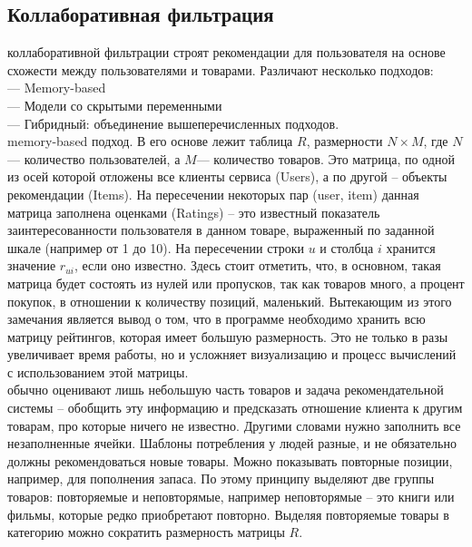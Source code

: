 \documentclass{article}
\newcommand\tab[1][1cm]{\hspace*{#1}}
\begin{document}
\subsection{Коллаборативная фильтрация}
 коллаборативной фильтрации строят рекомендации для пользователя на основе схожести между пользователями и товарами. Различают несколько подходов:\\
\tab— Memory-based\\
\tab— Модели со скрытыми переменными\\
\tab— Гибридный: объединение вышеперечисленных подходов.\\
 memory-based подход. В его основе лежит таблица $R$, ﻿размерности $N\times M$, где ﻿$N$﻿ — количество пользователей, а $M$— количество товаров. Это матрица, по одной из осей которой отложены все клиенты сервиса (Users), а по другой – объекты рекомендации (Items). На пересечении некоторых пар (user, item) данная матрица заполнена оценками (Ratings) – это известный показатель заинтересованности пользователя в данном товаре, выраженный по заданной шкале (например от 1 до 10). На пересечении строки $u$ и столбца ﻿$i$﻿ хранится значение ﻿$r_{ui}$﻿, если оно известно. Здесь стоит отметить, что, в основном, такая матрица будет состоять из нулей или пропусков, так как товаров много, а процент покупок, в отношении к количеству позиций, маленький. Вытекающим из этого замечания является вывод о том, что в программе необходимо хранить всю матрицу рейтингов, которая имеет большую размерность. Это не только в разы увеличивает время работы, но и усложняет визуализацию и процесс вычислений с использованием этой матрицы. \\
 обычно оценивают лишь небольшую часть товаров и задача рекомендательной системы – обобщить эту информацию и предсказать отношение клиента к другим товарам, про которые ничего не известно. Другими словами нужно заполнить все незаполненные ячейки. Шаблоны потребления у людей разные, и не обязательно должны рекомендоваться новые товары. Можно показывать повторные позиции, например, для пополнения запаса. По этому принципу выделяют две группы товаров: повторяемые и неповторямые, например неповторямые – это книги или фильмы, которые редко приобретают повторно. Выделяя повторяемые товары в категорию можно сократить размерность матрицы $R$.\\
\end{document}
